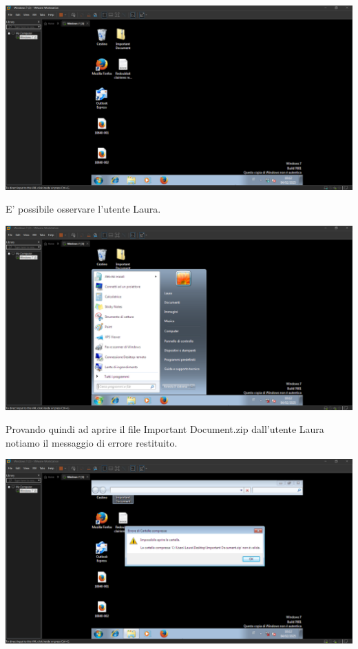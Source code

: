 \begin{center}
    \includegraphics[width=1\textwidth]{img/live.png}
\end{center}
E' possibile osservare l'utente Laura.
\begin{center}
    \includegraphics[width=1\textwidth]{img/live-laura.png}\vspace{100pt}\\
\end{center}
Provando quindi ad aprire il file Important Document.zip dall'utente Laura notiamo il messaggio di errore restituito.
\begin{center}
    \includegraphics[width=1\textwidth]{img/important-fail.png}
\end{center}